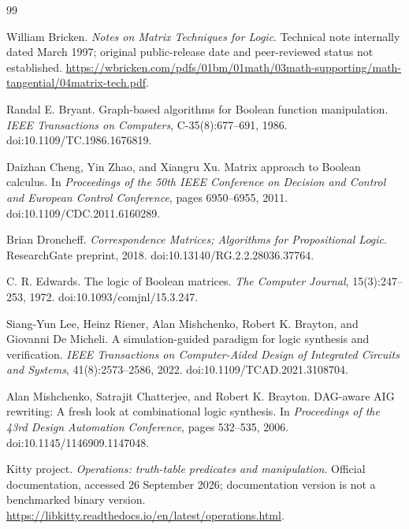 \documentclass[10pt]{article}
\theoremstyle{plain}
\theoremstyle{definition}
\theoremstyle{remark}
\begin{document}
\begin{thebibliography}{99}
\raggedright

William Bricken.
\newblock \emph{Notes on Matrix Techniques for Logic}.
\newblock Technical note internally dated March 1997; original public-release date and peer-reviewed status not established.
\newblock \url{https://wbricken.com/pdfs/01bm/01math/03math-supporting/math-tangential/04matrix-tech.pdf}.

Randal E. Bryant.
\newblock Graph-based algorithms for Boolean function manipulation.
\newblock \emph{IEEE Transactions on Computers}, C-35(8):677--691, 1986.
\newblock doi:10.1109/TC.1986.1676819.

Daizhan Cheng, Yin Zhao, and Xiangru Xu.
\newblock Matrix approach to Boolean calculus.
\newblock In \emph{Proceedings of the 50th IEEE Conference on Decision and Control and European Control Conference}, pages 6950--6955, 2011.
\newblock doi:10.1109/CDC.2011.6160289.

Brian Droncheff.
\newblock \emph{Correspondence Matrices; Algorithms for Propositional Logic}.
\newblock ResearchGate preprint, 2018.
\newblock doi:10.13140/RG.2.2.28036.37764.

C. R. Edwards.
\newblock The logic of Boolean matrices.
\newblock \emph{The Computer Journal}, 15(3):247--253, 1972.
\newblock doi:10.1093/comjnl/15.3.247.

Siang-Yun Lee, Heinz Riener, Alan Mishchenko, Robert K. Brayton, and Giovanni De Micheli.
\newblock A simulation-guided paradigm for logic synthesis and verification.
\newblock \emph{IEEE Transactions on Computer-Aided Design of Integrated Circuits and Systems}, 41(8):2573--2586, 2022.
\newblock doi:10.1109/TCAD.2021.3108704.

Alan Mishchenko, Satrajit Chatterjee, and Robert K. Brayton.
\newblock DAG-aware AIG rewriting: A fresh look at combinational logic synthesis.
\newblock In \emph{Proceedings of the 43rd Design Automation Conference}, pages 532--535, 2006.
\newblock doi:10.1145/1146909.1147048.

Kitty project.
\newblock \emph{Operations: truth-table predicates and manipulation}.
\newblock Official documentation, accessed 26 September 2026; documentation version is not a benchmarked binary version.
\newblock \url{https://libkitty.readthedocs.io/en/latest/operations.html}.


\end{thebibliography}
\end{document}
